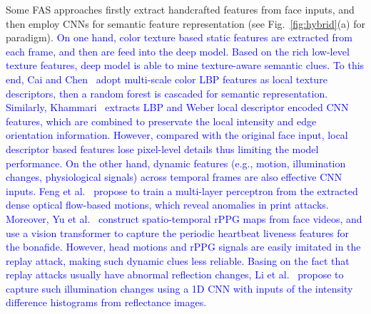 \documentclass[10pt,journal,compsoc]{IEEEtran}
\begin{document}
Some FAS approaches firstly extract handcrafted features from face inputs, and then employ CNNs for semantic feature representation (see Fig.~\ref{fig:hybrid}(a) for paradigm). \textcolor{blue}{On one hand, color texture based static features are extracted from each frame, and then are feed into the deep model. Based on the rich low-level texture features, deep model is able to mine texture-aware semantic clues. To this end, Cai and Chen~\cite{cai2019learning} adopt multi-scale color LBP features as local texture descriptors, then a random forest is cascaded for semantic representation. Similarly, Khammari~\cite{khammari2019robust} extracts LBP and Weber local descriptor encoded CNN features, which are combined to preservate the local intensity and edge orientation information. However, compared with the original face input, local descriptor based features lose pixel-level details thus limiting the model performance. On the other hand, dynamic features (e.g., motion, illumination changes, physiological signals) across temporal frames are also effective CNN inputs. Feng et al.~\cite{feng2016integration} propose to train a multi-layer perceptron from the extracted dense optical flow-based motions, which reveal anomalies in print attacks. Moreover, Yu et al.~\cite{yu2021transrppg} construct spatio-temporal rPPG maps from face videos, and use a vision transformer to capture the periodic heartbeat liveness features for the bonafide. However, head motions and rPPG signals are easily imitated in the replay attack, making such dynamic clues less reliable. Basing on the fact that replay attacks usually have abnormal reflection changes, Li et al.~\cite{li20203d} propose to capture such illumination changes using a 1D CNN with inputs of the intensity difference histograms from reflectance images. }  
\end{document}

